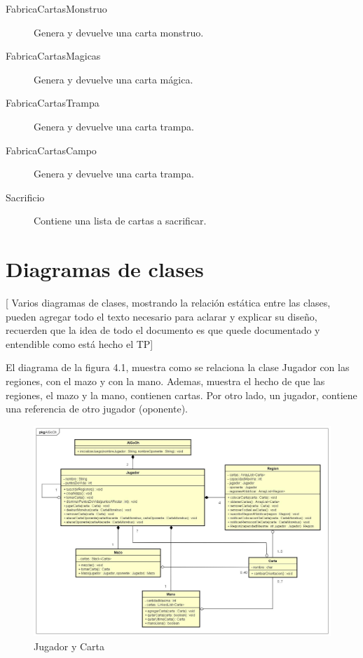\begin{description}
\item[FabricaCartasMonstruo] Genera y devuelve una carta monstruo.

\item[FabricaCartasMagicas] Genera y devuelve una carta mágica.

\item[FabricaCartasTrampa] Genera y devuelve una carta trampa.

\item[FabricaCartasCampo] Genera y devuelve una carta trampa.

\item[Sacrificio] Contiene una lista de cartas a sacrificar.

\end{description}


\clearpage
\section{Diagramas de clases}

[ Varios diagramas de clases, mostrando la relación estática entre las
clases, pueden agregar todo el texto necesario para aclarar y explicar su
diseño, recuerden que la idea de todo el documento es que quede
documentado y entendible como está hecho el TP]

El diagrama de la figura 4.1, muestra como se relaciona la clase Jugador con las regiones, con el mazo y con la mano. Ademas, muestra el hecho de que las regiones, el mazo y la mano, contienen cartas. Por otro lado, un jugador, contiene una referencia de otro jugador (oponente).

\begin{figure}[H]
	\centering
	\includegraphics[scale=0.3]{includes/Jugador}
	\caption{Jugador y Carta}
	\label{Jugador}
\end{figure}

